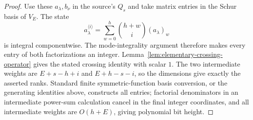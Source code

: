 \begin{proof}
Use these $a_\lambda,b_\nu$ in the source's $Q_s$ and take matrix
entries in the Schur basis of $V_E$. The state
\[
 a_\lambda^{\langle i\rangle}
 =\sum_{w=0}^h\binom{h+w}{i}(a_\lambda)_w
\]
is integral componentwise. The mode-integrality argument therefore
makes every entry of both factorizations an integer.
Lemma~\ref{lem:elementary-crossing-operator} gives
the stated crossing identity with scalar $1$. The two intermediate
weights are $E+s-h+i$ and $E+h-s-i$, so the dimensions give exactly
the asserted ranks. Standard finite symmetric-function basis
conversion, or the generating identities above, constructs all
entries; factorial denominators in an intermediate power-sum
calculation cancel in the final integer coordinates, and all
intermediate weights are $O(h+E)$, giving polynomial bit height.
\end{proof}
